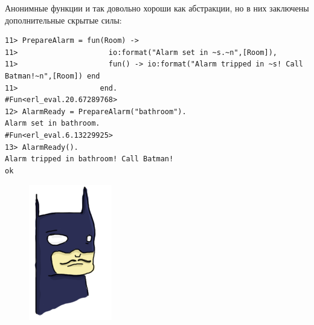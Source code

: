 \documentclass[a4paper,12pt]{report}
\begin{document}
Анонимные функции и так довольно хороши как абстракции, но в них заключены дополнительные скрытые силы:
\begin{lstlisting}[style=erlang]
11> PrepareAlarm = fun(Room) ->
11>                     io:format("Alarm set in ~s.~n",[Room]),
11>                     fun() -> io:format("Alarm tripped in ~s! Call Batman!~n",[Room]) end
11>                   end.
#Fun<erl_eval.20.67289768>
12> AlarmReady = PrepareAlarm("bathroom").
Alarm set in bathroom.
#Fun<erl_eval.6.13229925>
13> AlarmReady().
Alarm tripped in bathroom! Call Batman!
ok
\end{lstlisting}
\begin{figure}
    \includegraphics[width=1\linewidth]{batman.png}
\end{figure}
\end{document}
